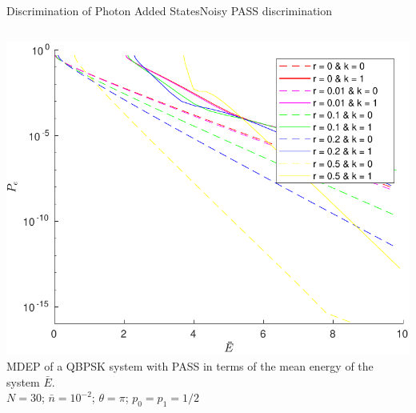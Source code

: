 \begin{frame}{Discrimination of Photon Added States}{Noisy PASS discrimination}
\begin{columns}
        \begin{column}{0.5\linewidth}%
            \begin{center}
                \includegraphics[width=1\textwidth]{Pictures/fig3.7.pdf}\\
                \scriptsize{
                MDEP of a QBPSK system with PASS in terms of the mean energy of the system $\bar{E}$.\\
                $N=30$; $\bar{n}=10^{-2}$; $\theta=\pi$; $p_0=p_1=1/2$
                }
            \end{center}
        \end{column}
    \end{columns}
\end{frame}  
